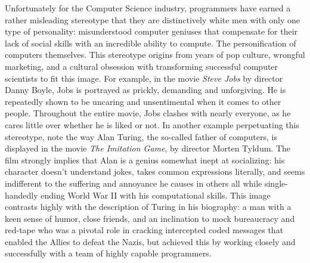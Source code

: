 \documentclass[12pt]{article}
\begin{document}
		Unfortunately for the Computer Science industry, programmers have earned a rather misleading stereotype that they are distinctively white men with only one type of personality: misunderstood computer geniuses that compensate for their lack of social skills with an incredible ability to compute. The personification of computers themselves. This stereotype origins from years of pop culture, wrongful marketing, and a cultural obsession with transforming successful computer scientists to fit this image. For example, in the movie \textit{Steve Jobs} by director Danny Boyle, Jobs is portrayed as prickly, demanding and unforgiving. He is repeatedly shown to be uncaring and unsentimental when it comes to other people. Throughout the entire movie, Jobs clashes with nearly everyone, as he cares little over whether he is liked or not\cite{stevejobs}. In another example perpetuating this stereotype, note the way Alan Turing, the so-called father of computers, is displayed in the movie \textit{The Imitation Game}, by director Morten Tyldum. The film strongly implies that Alan is a genius somewhat inept at socializing: his character doesn’t understand jokes, takes common expressions literally, and seems indifferent to the suffering and annoyance he causes in others\cite{imitation} all while single-handedly ending World War II with his computational skills. This image contrasts highly with the description of Turing in his biography: a man with a keen sense of humor, close friends, and an inclination to mock bureaucracy and red-tape who was a pivotal role in cracking intercepted coded messages that enabled the Allies to defeat the Nazis, but achieved this by working closely and successfully with a team of highly capable programmers.\\
		
\end{document}
